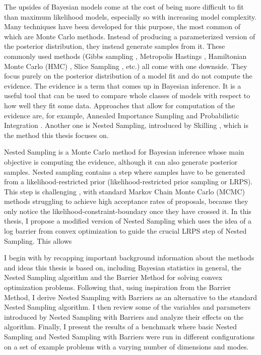 \documentclass[12pt, a4paper]{report}
\begin{document}
The upsides of Bayesian models come at the cost of being more difficult to fit than maximum likelihood models, especially so with increasing model complexity.
Many techniques have been developed for this purpose, the most common of which are Monte Carlo methods.
Instead of producing a parameterized version of the posterior distribution, they instead generate samples from it.
These commonly used methods (Gibbs sampling \cite{gibbs}, Metropolis Hastings \cite{metropolishastings}, Hamiltonian Monte Carlo (HMC) \cite{hmc}, Slice Sampling \cite{slice_sampling}, etc.) all come with one downside.
They focus purely on the posterior distribution of a model fit and do not compute the evidence.
The evidence is a term that comes up in Bayesian inference.
It is a useful tool that can be used to compare whole classes of models with respect to how well they fit some data.
Approaches that allow for computation of the evidence are, for example, Annealed Importance Sampling \cite{annealed_importance_sampling} and Probabilistic Integration \cite{bayesian_cubature}.
Another one is Nested Sampling, introduced by Skilling \cite{skilling}, which is the method this thesis focuses on.

Nested Sampling is a Monte Carlo method for Bayesian inference whose main objective is computing the evidence, although it can also generate posterior samples.
Nested sampling contains a step where samples have to be generated from a likelihood-restricted prior (likelihood-restricted prior sampling or LRPS).
This step is challenging \cite[9]{hmc_in_ns}, with standard Markov Chain Monte Carlo (MCMC) methods struggling to achieve high acceptance rates of proposals, because they only notice the likelihood-constraint-boundary once they have crossed it.
In this thesis, I propose a modified version of Nested Sampling which uses the idea of a log barrier from convex optimization to guide the crucial LRPS step of Nested Sampling.
This allows %

I begin with by recapping important background information about the methods and ideas this thesis is based on, including Bayesian statistics in general, the Nested Sampling algorithm and the Barrier Method for solving convex optimization problems.
Following that, using inspiration from the Barrier Method, I derive Nested Sampling with Barriers as an alternative to the standard Nested Sampling algorithm.
I then review some of the variables and parameters introduced by Nested Sampling with Barriers and analyze their effects on the algorithm.
Finally, I present the results of a benchmark where basic Nested Sampling and Nested Sampling with Barriers were run in different configurations on a set of example problems with a varying number of dimensions and modes.
\setcounter{page}{5}
\end{document}
